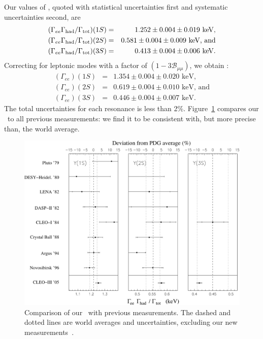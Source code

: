 \documentclass{cornell}
\begin{document}
Our values of \geehadtot, quoted with statistical uncertainties
first and systematic uncertainties second, are
\begin{eqnarray}
  (\Gamma_{ee}\Gamma_{\mbox{\scriptsize had}}/\Gamma_{\mbox{\scriptsize tot}})(1S) &=& 1.252 \pm 0.004 \pm 0.019 \mbox{ keV,} \\
  (\Gamma_{ee}\Gamma_{\mbox{\scriptsize had}}/\Gamma_{\mbox{\scriptsize tot}})(2S) &=& 0.581 \pm 0.004 \pm 0.009 \mbox{ keV, and} \\
  (\Gamma_{ee}\Gamma_{\mbox{\scriptsize had}}/\Gamma_{\mbox{\scriptsize tot}})(3S) &=& 0.413 \pm 0.004 \pm 0.006 \mbox{ keV.}
\end{eqnarray}
Correcting for leptonic modes with a factor of $(1-3{\mathcal B}_{\mu\mu})$, we obtain \gee:
\begin{eqnarray}
  (\Gamma_{ee})(1S) &=& 1.354 \pm 0.004 \pm 0.020 \mbox{ keV,} \\
  (\Gamma_{ee})(2S) &=& 0.619 \pm 0.004 \pm 0.010 \mbox{ keV, and} \\
  (\Gamma_{ee})(3S) &=& 0.446 \pm 0.004 \pm 0.007 \mbox{ keV.}
\end{eqnarray}
The total uncertainties for each resonance is less than 2\%.
Figure~\ref{historyplot} compares our \geehadtot\ to all previous
measurements: we find it to be consistent with, but more precise than,
the world average.

\begin{figure}
  \begin{center}
    \includegraphics[width=0.7\linewidth]{plots/historyplot}
  \end{center}
  \caption[Comparison of our \geehadtot\ with previous
  measurements]{\label{historyplot} Comparison of our \geehadtot\ with
  previous measurements.  The dashed and dotted lines are world
  averages and uncertainties, excluding our new
  measurements~\cite{pdg}.}
\end{figure}
\end{document}
